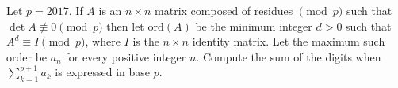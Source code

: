 Let $p = 2017$. If $A$ is an $n\times n$ matrix composed of residues $\pmod{p}$ such that $\det A\not\equiv 0\pmod{p}$ then let $\text{ord}(A)$ be the minimum integer $d > 0$ such that $A^d\equiv I\pmod{p}$, where $I$ is the $n\times n$ identity matrix. Let the maximum such order be $a_n$ for every positive integer $n$. Compute the sum of the digits when $\sum_{k = 1}^{p + 1} a_k$ is expressed in base $p$.
